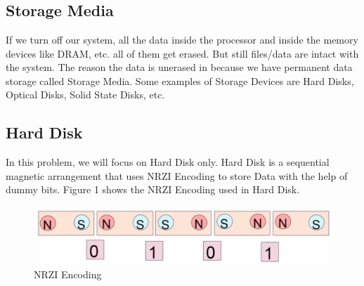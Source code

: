 \documentclass[12pt]{article}
\begin{document}
\maketitle


\section{}
\subsection{Storage Media}
If we turn off our system, all the data inside the processor and inside the memory devices like DRAM, etc. all of them get erased. But still files/data are intact with the system. The reason the data is unerased in because we have permanent data storage called Storage Media. Some examples of Storage Devices are Hard Disks, Optical Disks, Solid State Disks, etc.

\subsection{Hard Disk}
In this problem, we will focus on Hard Disk only. Hard Disk is a sequential magnetic arrangement that uses NRZI Encoding to store Data with the help of dummy bits. Figure 1 shows the NRZI Encoding used in Hard Disk. 
\begin{figure}
    \centering
    \includegraphics[width=12cm]{Assignment-14/NRZI.png}
    \caption{NRZI Encoding}
\end{figure}
\end{document}
